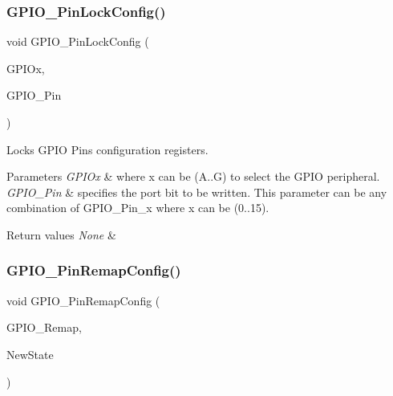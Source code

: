 \subsubsection{\texorpdfstring{GPIO\_PinLockConfig()}{GPIO\_PinLockConfig()}}
{\footnotesize\ttfamily void G\+P\+I\+O\+\_\+\+Pin\+Lock\+Config (\begin{DoxyParamCaption}\item[{\mbox{\hyperlink{struct_g_p_i_o___type_def}{G\+P\+I\+O\+\_\+\+Type\+Def}} $\ast$}]{G\+P\+I\+Ox,  }\item[{uint16\+\_\+t}]{G\+P\+I\+O\+\_\+\+Pin }\end{DoxyParamCaption})}



Locks G\+P\+IO Pins configuration registers. 


\begin{DoxyParams}{Parameters}
{\em G\+P\+I\+Ox} & where x can be (A..G) to select the G\+P\+IO peripheral. \\
\hline
{\em G\+P\+I\+O\+\_\+\+Pin} & specifies the port bit to be written. This parameter can be any combination of G\+P\+I\+O\+\_\+\+Pin\+\_\+x where x can be (0..15). \\
\hline
\end{DoxyParams}

\begin{DoxyRetVals}{Return values}
{\em None} & \\
\hline
\end{DoxyRetVals}
\mbox{\label{group___g_p_i_o___exported___functions_ga64eb76f6211b840daf9829289df4208b}} 
\subsubsection{\texorpdfstring{GPIO\_PinRemapConfig()}{GPIO\_PinRemapConfig()}}
{\footnotesize\ttfamily void G\+P\+I\+O\+\_\+\+Pin\+Remap\+Config (\begin{DoxyParamCaption}\item[{uint32\+\_\+t}]{G\+P\+I\+O\+\_\+\+Remap,  }\item[{\mbox{\hyperlink{group___exported__types_gac9a7e9a35d2513ec15c3b537aaa4fba1}{Functional\+State}}}]{New\+State }\end{DoxyParamCaption})}



